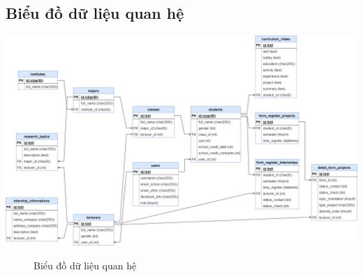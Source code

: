 \subsection{Biểu đồ dữ liệu quan hệ}
\begin{landscape}
  \begin{center}
    \includegraphics[width=1.5\textwidth]{../drawio/db_sv11.png}
    \begin{figure}[h]
      \centering
      \caption{Biểu đồ dữ liệu quan hệ}
    \end{figure}
  \end{center}
\end{landscape}